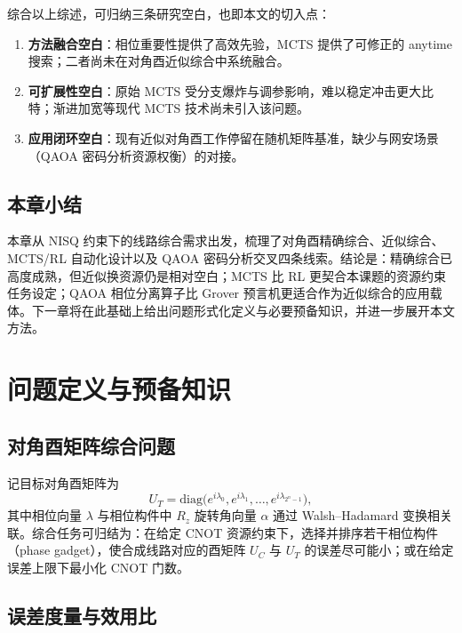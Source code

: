 \documentclass{HDU-Bachelor-Thesis}
\begin{document}
综合以上综述，可归纳三条研究空白，也即本文的切入点：

\begin{enumerate}
  \item \textbf{方法融合空白}：相位重要性提供了高效先验，MCTS 提供了可修正的 anytime 搜索；二者尚未在对角酉近似综合中系统融合。
  \item \textbf{可扩展性空白}：原始 MCTS 受分支爆炸与调参影响，难以稳定冲击更大比特；渐进加宽等现代 MCTS 技术尚未引入该问题。
  \item \textbf{应用闭环空白}：现有近似对角酉工作停留在随机矩阵基准，缺少与网安场景（QAOA 密码分析资源权衡）的对接。
\end{enumerate}

\subsection{本章小结}

本章从 NISQ 约束下的线路综合需求出发，梳理了对角酉精确综合、近似综合、MCTS/RL 自动化设计以及 QAOA 密码分析交叉四条线索。结论是：精确综合已高度成熟，但近似换资源仍是相对空白；MCTS 比 RL 更契合本课题的资源约束任务设定；QAOA 相位分离算子比 Grover 预言机更适合作为近似综合的应用载体。下一章将在此基础上给出问题形式化定义与必要预备知识，并进一步展开本文方法。

\clearpage
\section{问题定义与预备知识}

\subsection{对角酉矩阵综合问题}

记目标对角酉矩阵为
\begin{equation}
  U_T=\mathrm{diag}\bigl(e^{i\lambda_0},e^{i\lambda_1},\ldots,e^{i\lambda_{2^n-1}}\bigr),
\end{equation}
其中相位向量 $\lambda$ 与相位构件中 $R_z$ 旋转角向量 $\alpha$ 通过 Walsh--Hadamard 变换相关联。综合任务可归结为：在给定 CNOT 资源约束下，选择并排序若干相位构件（phase gadget），使合成线路对应的酉矩阵 $U_C$ 与 $U_T$ 的误差尽可能小；或在给定误差上限下最小化 CNOT 门数。

\subsection{误差度量与效用比}
\end{document}
